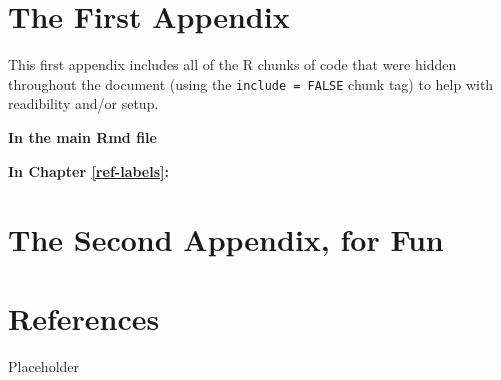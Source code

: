\documentclass[12pt,twoside]{reedthesis}
\begin{document}
\hypertarget{the-first-appendix}{%
\chapter{The First Appendix}\label{the-first-appendix}}

This first appendix includes all of the R chunks of code that were hidden throughout the document (using the \texttt{include\ =\ FALSE} chunk tag) to help with readibility and/or setup.

\textbf{In the main Rmd file}

\textbf{In Chapter \ref{ref-labels}:}

\hypertarget{the-second-appendix-for-fun}{%
\chapter{The Second Appendix, for Fun}\label{the-second-appendix-for-fun}}

\hypertarget{references}{%
\chapter*{References}\label{references}}

Placeholder


\end{document}
